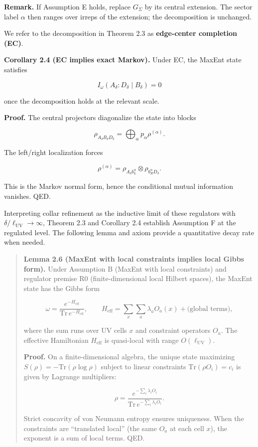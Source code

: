 \documentclass[
]{article}
\begin{document}
\textbf{Remark.} If Assumption E holds, replace \(G_\Sigma\) by its
central extension. The sector label \(\alpha\) then ranges over irreps
of the extension; the decomposition is unchanged.

We refer to the decomposition in Theorem 2.3 as \textbf{edge-center
completion (EC)}.

\textbf{Corollary 2.4 (EC implies exact Markov).} Under EC, the MaxEnt
state satisfies

\[
I_\omega(A_\delta:D_\delta \mid B_\delta) = 0
\]

once the decomposition holds at the relevant scale.

\textbf{Proof.} The central projectors diagonalize the state into blocks

\[
\rho_{A_\delta B_\delta D_\delta}
= \bigoplus_\alpha p_\alpha \rho^{(\alpha)}.
\]

The left/right localization forces

\[
\rho^{(\alpha)} =
\rho_{A_\delta b_L^\alpha} \otimes \rho_{b_R^\alpha D_\delta}.
\]

This is the Markov normal form, hence the conditional mutual information
vanishes. QED.

Interpreting collar refinement as the inductive limit of these
regulators with \(\delta/\ell_{\mathrm{UV}} \to \infty\), Theorem 2.3
and Corollary 2.4 establish Assumption F at the regulated level. The
following lemma and axiom provide a quantitative decay rate when needed.

\begin{quote}
\textbf{Lemma 2.6 (MaxEnt with local constraints implies local Gibbs
form).} Under Assumption B (MaxEnt with local constraints) and regulator
premise R0 (finite-dimensional local Hilbert spaces), the MaxEnt state
has the Gibbs form

\[
\omega = \frac{e^{-H_{\mathrm{eff}}}}{\mathrm{Tr}\,e^{-H_{\mathrm{eff}}}},
\qquad
H_{\mathrm{eff}} = \sum_x \sum_a \lambda_a O_a(x) + \text{(global terms)},
\]

where the sum runs over UV cells \(x\) and constraint operators \(O_a\).
The effective Hamiltonian \(H_{\mathrm{eff}}\) is quasi-local with range
\(O(\ell_{\mathrm{UV}})\).

\textbf{Proof.} On a finite-dimensional algebra, the unique state
maximizing \(S(\rho) = -\mathrm{Tr}(\rho \log \rho)\) subject to linear
constraints \(\mathrm{Tr}(\rho O_i) = c_i\) is given by Lagrange
multipliers:

\[
\rho = \frac{e^{-\sum_i \lambda_i O_i}}{\mathrm{Tr}\,e^{-\sum_i \lambda_i O_i}}.
\]

Strict concavity of von Neumann entropy ensures uniqueness. When the
constraints are ``translated local'' (the same \(O_a\) at each cell
\(x\)), the exponent is a sum of local terms. QED.
\end{quote}
\end{document}
